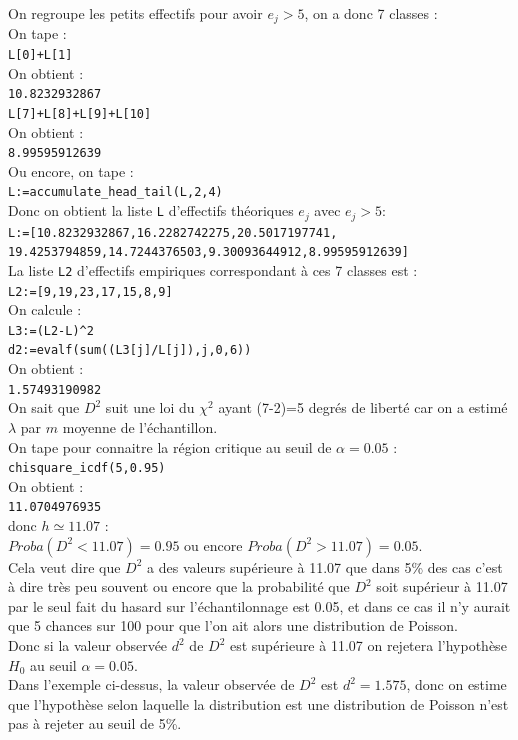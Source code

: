 \documentclass[a4paper,11pt]{book}
\begin{document}
On regroupe les petits effectifs pour avoir $e_j>5$, on a donc 7 classes :\\
On tape :\\
{\tt L[0]+L[1]}\\
On obtient :\\
{\tt 10.8232932867}\\
{\tt L[7]+L[8]+L[9]+L[10]}\\
On obtient :\\
{\tt 8.99595912639}\\
Ou encore, on tape :\\
{\tt L:=accumulate\_head\_tail(L,2,4)}\\
Donc on obtient la liste {\tt L} d'effectifs th\'eoriques $e_j$ avec $e_j>5$:\\
{\tt L:=[10.8232932867,16.2282742275,20.5017197741,}\\
{\tt 19.4253794859,14.7244376503,9.30093644912,8.99595912639]}\\
La liste {\tt L2} d'effectifs empiriques correspondant \`a ces 7 classes est :\\
{\tt L2:=[9,19,23,17,15,8,9]}\\
On calcule :\\
{\tt L3:=(L2-L)\verb|^|2}\\
{\tt d2:=evalf(sum((L3[j]/L[j]),j,0,6))}\\
On obtient :\\
{\tt 1.57493190982}\\
On sait que $D^2$ suit une loi du $\chi^2$ ayant (7-2)=5 degr\'es de libert\'e
car on a estim\'e $\lambda$ par $m$ moyenne de l'\'echantillon.\\
On tape pour connaitre la r\'egion critique au seuil de $\alpha=0.05$ :\\
{\tt chisquare\_icdf(5,0.95)}\\
On obtient :\\
{\tt 11.0704976935}  \\
donc $h \simeq 11.07$ :\\
$Proba(D^2<11.07)=0.95$ ou encore $Proba(D^2>11.07)=0.05$.\\
Cela  veut dire 
que $D^2$ a des valeurs sup\'erieure \`a 11.07 que dans 5\% des cas c'est 
\`a dire tr\`es peu souvent ou encore que la probabilit\'e que $D^2$ soit 
sup\'erieur \`a 11.07 par le seul fait du hasard sur l'\'echantilonnage est 
0.05, et dans ce cas il n'y aurait  que 5 chances sur 100 pour que l'on ait
 alors une distribution de Poisson.\\
Donc si la valeur 
observ\'ee $d^2$ de $D^2$ est sup\'erieure \`a 11.07 on rejetera l'hypoth\`ese 
$H_0$ au seuil $\alpha=0.05$.\\
Dans l'exemple ci-dessus, la valeur observ\'ee de $D^2$ est $d^2=1.575$, donc
on estime que l'hypoth\`ese selon laquelle la distribution est une distribution
 de Poisson n'est pas \`a rejeter au seuil de 5\%.
\end{document}
